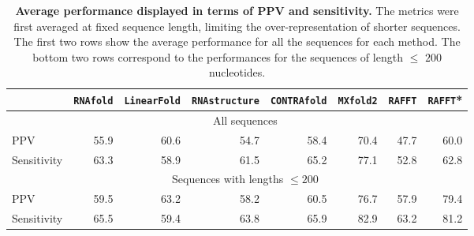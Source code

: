 \begin{table}[htbp]
	\caption{\label{Tab:average_perf}\textbf{Average performance displayed in terms of PPV and sensitivity.} The metrics were first averaged at fixed sequence length, limiting the over-representation of shorter sequences. The first two rows show the average performance for all the sequences for each method. The bottom two rows correspond to the performances for the sequences of length \(\leq\) $200$ nucleotides.}
\centering
\hspace*{-4cm}
\begin{tabular}{lrrrrrrr}
	\hline
	& \texttt{RNAfold} & \texttt{LinearFold} & \texttt{RNAstructure}  & \texttt{CONTRAfold} & \texttt{MXfold2} & \texttt{RAFFT} & \texttt{RAFFT}* \\
	\hline
	& \multicolumn{6}{c}{All sequences}\\
	\cmidrule{2-8}
	PPV         & 55.9 &	60.6 &	54.7 &	58.4 &	70.4 &	47.7 & 60.0 \\
	Sensitivity & 63.3 &	58.9 &	61.5 &	65.2 &	77.1 &	52.8 & 62.8 \\
	\hline
	& \multicolumn{6}{c}{Sequences with lengths \(\leq 200\)}\\
	\cmidrule{2-8}
	PPV         & 59.5 &	63.2 &	58.2 &	60.5 &	76.7 &	57.9 & 79.4  \\
	Sensitivity & 65.5 &	59.4 &	63.8 &	65.9 &	82.9 &	63.2 & 81.2 \\
	\hline
	
\end{tabular}

\end{table}


